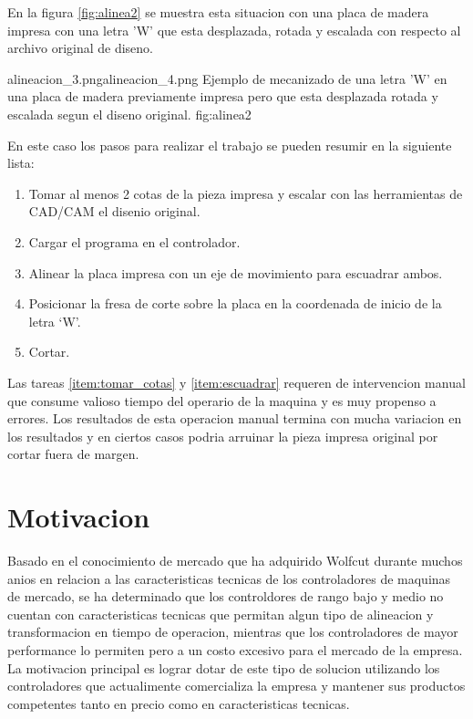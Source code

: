    En la figura \ref{fig:alinea2} se muestra esta situacion con una placa de madera impresa con una letra 'W' que esta desplazada, rotada y escalada con respecto al archivo original de diseno.

            {alineacion_3.png}{alineacion_4.png}
            {Ejemplo de mecanizado de una letra 'W' en una placa de madera previamente impresa pero que esta desplazada rotada y escalada segun el diseno original.}
            {fig:alinea2}

   En este caso los pasos para realizar el trabajo se pueden resumir en la siguiente lista:

   \begin{enumerate}
   \item{Tomar al menos 2 cotas de la pieza impresa y escalar con las herramientas de CAD/CAM el disenio original. \label{item:tomar_cotas} }
   \item{Cargar el programa en el controlador.}
   \item{Alinear la placa impresa con un eje de movimiento para escuadrar ambos.\label{item:escuadrar}}
   \item{Posicionar la fresa de corte sobre la placa en la coordenada de inicio de la letra `W'.}
   \item{Cortar.}
   \end{enumerate}

   Las tareas \ref{item:tomar_cotas} y \ref{item:escuadrar} requeren de intervencion manual que consume valioso tiempo del operario de la maquina y es muy propenso a errores. Los resultados de esta operacion manual termina con mucha variacion en los resultados y en ciertos casos podria arruinar la pieza impresa original por cortar fuera de margen.

\section{Motivacion}
   Basado en el conocimiento de mercado que ha adquirido Wolfcut durante muchos anios en relacion a las caracteristicas tecnicas de los controladores de maquinas de mercado, se ha determinado que los controldores de rango bajo y medio no cuentan con caracteristicas tecnicas que permitan algun tipo de alineacion y transformacion en tiempo de operacion, mientras que los controladores de mayor performance lo permiten pero a un costo excesivo para el mercado de la empresa. \\
   La motivacion principal es lograr dotar de este tipo de solucion utilizando los controladores que actualimente comercializa la empresa y mantener sus productos competentes tanto en precio como en caracteristicas tecnicas.

